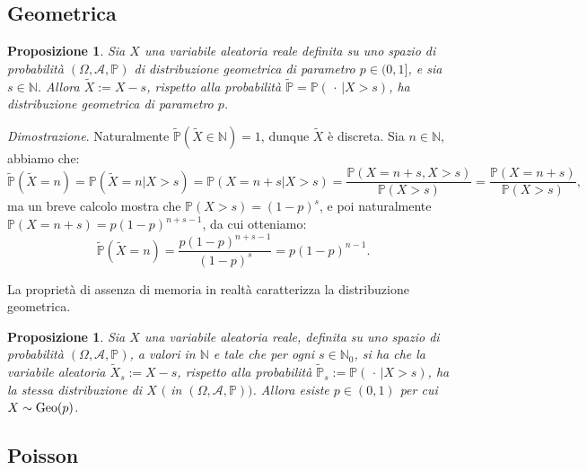\documentclass[11pt]{book}
\makeatletter
\theoremstyle{Definizione}
\theoremstyle{TeoremaProposizioneLemmaCorollario}
\newtheorem{mypropo}[myteo]{Proposizione}
\theoremstyle{OsservazioneNota}
\renewenvironment{proof}[1][\proofname]{\par
  \normalfont \topsep6\p@\@plus6\p@\relax
  \trivlist
  \item[\hskip\labelsep
        \itshape
    #1\@addpunct{.}]\ignorespaces
}{%
  \endtrivlist\@endpefalse
}
\newcommand{\N}{\mathbb{N}}
\renewcommand{\P}{\mathbb{P}}
\renewenvironment{proof}{\textsl{Dimostrazione}.}{}
\makeatother
\begin{document}
\subsection{Geometrica}
\begin{boxpro}
\begin{mypropo}
Sia $X$ una variabile aleatoria reale definita su uno spazio di probabilità $(\Omega,\mathcal{A},\P)$ di distribuzione geometrica di parametro $p\in (0,1]$, e sia $s\in \N$. Allora $\widetilde{X}:= X-s$, rispetto alla probabilità $\widetilde{\P} = \P(\,\cdot\,|X >s)$, ha distribuzione geometrica di parametro $p$.
\end{mypropo}
\tcblower
\begin{proof}
Naturalmente $\widetilde{\P}(\widetilde{X}\in \N) = 1$, dunque $\widetilde{X}$ è discreta.  Sia $n\in \N$, abbiamo che:
$$
\widetilde{\P}(\widetilde{X} = n) = \P(\widetilde{X} = n| X > s) = \P(X = n+s| X > s) = \frac{\P(X = n+s,X > s)}{\P(X > s)} = \frac{\P(X = n+s)}{\P(X > s)},
$$
ma un breve calcolo mostra che $\P(X > s) = (1-p)^s$, e poi naturalmente $\P(X = n+s) = p(1-p)^{n+s-1}$, da cui otteniamo:
$$
\widetilde{\P}(\widetilde{X} = n) = \frac{p(1-p)^{n+s-1}}{(1-p)^s} = p(1-p)^{n-1}.	
$$
\end{proof}
\end{boxpro}
La proprietà di assenza di memoria in realtà caratterizza la distribuzione geometrica.
\begin{boxpro}
\begin{mypropo}
Sia $X$ una variabile aleatoria reale, definita su uno spazio di probabilità $(\Omega,\mathcal{A},\P)$, a valori in $\N$ e tale che per ogni $s\in \N_0$, si ha che la variabile aleatoria $\widetilde{X}_s := X-s$, rispetto alla probabilità $\widetilde{\P}_s := \P(\,\cdot\,|X > s)$, ha la stessa distribuzione di $X$ $($ in $(\Omega,\mathcal{A},\P))$. Allora esiste $p\in (0,1)$ per cui $X \sim \textup{Geo}(p)$.
\end{mypropo}
\end{boxpro}
\subsection{Poisson}
\end{document}
